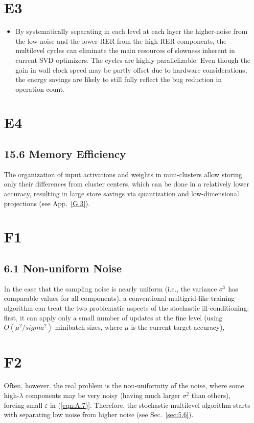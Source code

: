 \documentclass{article} %
\begin{document}
\section{E3}
\begin{itemize}
    \item By systematically separating in each level at each layer the higher-noise from the low-noise and the lower-RER from the high-RER components, the multilevel cycles can eliminate the main resources of slowness inherent in current SVD optimizers. The cycles are highly parallelizable. Even though the gain in wall clock speed may be partly offset due to hardware considerations, the energy savings are likely to still fully reflect the bug reduction in operation count.
\end{itemize}

\section{E4}
\subsection{15.6 Memory Efficiency}
The organization of input activations and weights in mini-clusters allow storing only their differences from cluster centers, which can be done in a relatively lower accuracy, resulting in large store savings via quantization and low-dimensional projections (see App.~\ref{G.3}).

\section{F1}
\subsection{6.1 Non-uniform Noise}
In the case that the sampling noise is nearly uniform (i.e., the variance $\sigma^2$ has comparable values for all components), a conventional multigrid-like training algorithm can treat the two problematic aspects of the stochastic ill-conditioning: first, it can apply only a small number of updates at the fine level (using $O(\mu^2/sigma^2)$ minibatch sizes, where $\mu$ is the current target accuracy),

\section{F2}
Often, however, the real problem is the non-uniformity of the noise, where some high-$\lambda$ components may be very noisy (having much larger $\sigma^2$ than others), forcing small $\varepsilon$ in (\ref{eqn:A.7)}. Therefore, the stochastic multilevel algorithm starts with separating low noise from higher noise (see Sec.~\ref{sec:5.6}).



\end{document}
